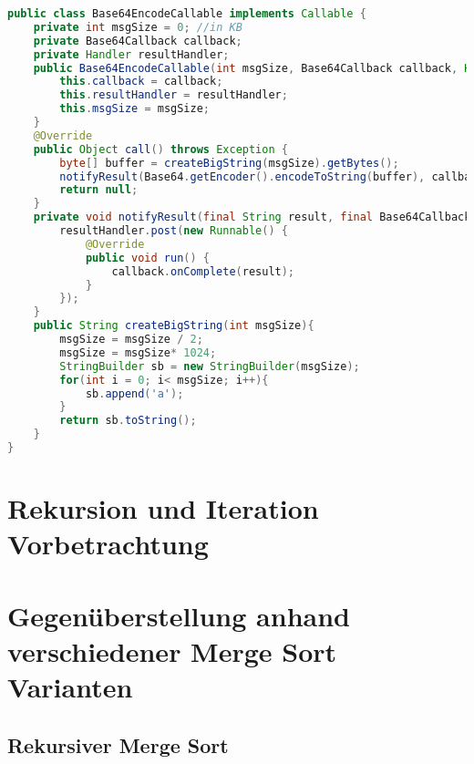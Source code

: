 \begin{lstlisting}[language=java,caption={Base64-Callable aus derEnergyEfficience App},label=lst:Base64Callable]
public class Base64EncodeCallable implements Callable {
    private int msgSize = 0; //in KB
    private Base64Callback callback;
    private Handler resultHandler;
    public Base64EncodeCallable(int msgSize, Base64Callback callback, Handler resultHandler){
        this.callback = callback;
        this.resultHandler = resultHandler;
        this.msgSize = msgSize;
    }
    @Override
    public Object call() throws Exception {
        byte[] buffer = createBigString(msgSize).getBytes();
        notifyResult(Base64.getEncoder().encodeToString(buffer), callback, resultHandler);
        return null;
    }
    private void notifyResult(final String result, final Base64Callback callback, final Handler resultHandler){
        resultHandler.post(new Runnable() {
            @Override
            public void run() {
                callback.onComplete(result);
            }
        });
    }
    public String createBigString(int msgSize){
        msgSize = msgSize / 2;
        msgSize = msgSize* 1024;
        StringBuilder sb = new StringBuilder(msgSize);
        for(int i = 0; i< msgSize; i++){
            sb.append('a');
        }
        return sb.toString();
    }
}
\end{lstlisting}

\section{Rekursion und Iteration Vorbetrachtung}
\section{Gegenüberstellung anhand verschiedener Merge Sort Varianten}
\subsection{Rekursiver Merge Sort}

